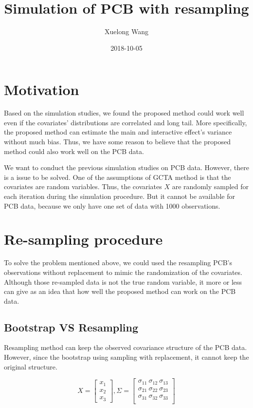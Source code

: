 \documentclass[]{article}
\title{Simulation of PCB with resampling}
\author{Xuelong Wang}
\date{2018-10-05}
\begin{document}
\maketitle

{
\setcounter{tocdepth}{2}
\tableofcontents
}
\section{Motivation}\label{motivation}

Based on the simulation studies, we found the proposed method could work
well even if the covariates' distributions are correlated and long tail.
More specifically, the proposed method can estimate the main and
interactive effect's variance without much bias. Thus, we have some
reason to believe that the proposed method could also work well on the
PCB data.

We want to conduct the previous simulation studies on PCB data. However,
there is a issue to be solved. One of the assumptions of GCTA method is
that the covariates are random variables. Thus, the covariates \(X\) are
randomly sampled for each iteration during the simulation procedure. But
it cannot be available for PCB data, because we only have one set of
data with 1000 observations.

\section{Re-sampling procedure}\label{re-sampling-procedure}

To solve the problem mentioned above, we could used the resampling PCB's
observations without replacement to mimic the randomization of the
covariates. Although those re-sampled data is not the true random
variable, it more or less can give as an idea that how well the proposed
method can work on the PCB data.

\subsection{Bootstrap VS Resampling}\label{bootstrap-vs-resampling}

Resampling method can keep the observed covariance structure of the PCB
data. However, since the bootstrap using sampling with replacement, it
cannot keep the original structure.

\[
  X = \begin{bmatrix}   
        x_1\\
        x_2\\
        x_3
      \end{bmatrix},
  \Sigma = \begin{bmatrix}   
        \sigma_{11} ~ \sigma_{12} ~ \sigma_{13}\\
        \sigma_{21} ~ \sigma_{22} ~ \sigma_{23}\\
        \sigma_{31} ~ \sigma_{32} ~ \sigma_{33}\\
      \end{bmatrix}
\]
\end{document}
